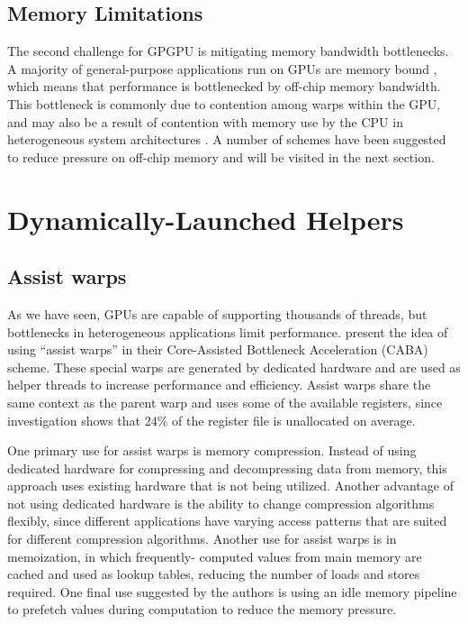 \documentclass[prodmode,acmtecs]{acmsmall} %
\begin{document}
\subsection{Memory Limitations}
The second challenge for GPGPU is mitigating memory bandwidth bottlenecks. A
majority of general-purpose applications run on GPUs are memory bound
\cite{AssistWarps}, which means that performance is bottlenecked by off-chip
memory bandwidth. This bottleneck is commonly due to contention among warps
within the GPU, and may also be a result of contention with memory use by the
CPU in heterogeneous system architectures
\cite{ManagingConcurrencyInHeterogeneous}. A number of schemes have been
suggested to reduce pressure on off-chip memory and will be visited in the next
section.

\section{Dynamically-Launched Helpers} \label{sec:dynamic}
\subsection{Assist warps}
As we have seen, GPUs are capable of supporting thousands of threads, but
bottlenecks in heterogeneous applications limit performance. \cite{AssistWarps}
present the idea of using ``assist warps'' in their Core-Assisted Bottleneck
Acceleration (CABA) scheme. These special warps are generated by dedicated
hardware and are used as helper threads to increase performance and efficiency.
Assist warps share the same context as the parent warp and uses some of the
available registers, since investigation shows that 24\% of the register file is
unallocated on average.

One primary use for assist warps is memory compression. Instead of using
dedicated hardware for compressing and decompressing data from memory, this
approach uses existing hardware that is not being utilized. Another advantage of
not using dedicated hardware is the ability to change compression algorithms
flexibly, since different applications have varying access patterns that are
suited for different compression algorithms. Another use for assist warps is in
memoization, in which frequently- computed values from main memory are cached
and used as lookup tables, reducing the number of loads and stores required. One
final use suggested by the authors is using an idle memory pipeline to prefetch
values during computation to reduce the memory pressure.
\end{document}

